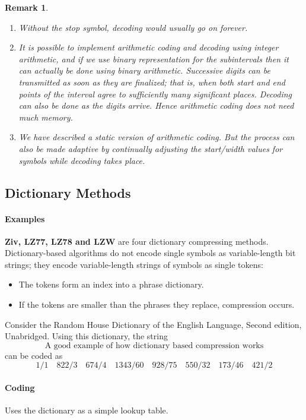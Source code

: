 \documentclass{article}
\newtheorem*{remark}{Remark}
\begin{document}
\begin{remark}
    \mbox{}
    \begin{enumerate}
        \item Without the stop symbol, decoding would usually go on forever.
        \item It is possible to implement arithmetic coding and decoding using integer arithmetic, and if we use binary representation for the subintervals then it can actually be done using binary arithmetic.  Successive digits can be transmitted as soon as they are finalized; that is, when both start and end points of the interval agree to sufficiently many significant places.  Decoding can also be done as the digits arrive.  Hence arithmetic coding does not need much memory.
        \item We have described a static version of arithmetic coding.  But the process can also be made adaptive by continually adjusting the start/width values for symbols while decoding takes place.
    \end{enumerate}    
\end{remark}

\subsection{Dictionary Methods}

\paragraph{Examples} \textbf{Ziv, LZ77, LZ78 and LZW} are four dictionary compressing methods.
Dictionary-based algorithms do not encode single symbols as variable-length bit strings; they encode variable-length strings of symbols as single tokens:

\begin{itemize}
    \item The tokens form an index into a phrase dictionary.
    \item If the tokens are smaller than the phrases they replace, compression occurs.
\end{itemize}

Consider the Random House Dictionary of the English Language, Second edition, Unabridged. Using this dictionary, the string
    \[\text{A good example of how dictionary based compression works}\]
can be coded as
    \[1/1 \quad 822/3 \quad 674/4 \quad 1343/60 \quad 928/75 \quad 550/32 \quad 173/46 \quad 421/2\]

\paragraph{Coding} Uses the dictionary as a simple lookup table.
\end{document}
